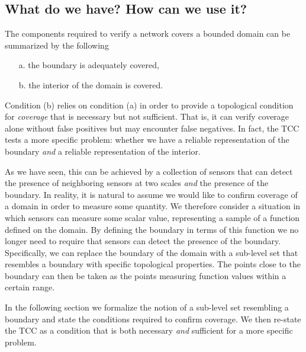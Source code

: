 \subsection{What do we have? How can we use it?}

The components required to verify a network covers a bounded domain can be summarized by the following
\begin{enumerate}
    \item[a.] the boundary is adequately covered,
    \item[b.] the interior of the domain is covered.
\end{enumerate}
Condition (b) relies on condition (a) in order to provide a topological condition for \emph{coverage} that is necessary but not sufficient.
That is, it can verify coverage alone without false positives but may encounter false negatives.
In fact, the TCC tests a more specific problem: whether we have a reliable representation of the boundary \emph{and} a reliable representation of the interior.

As we have seen, this can be achieved by a collection of sensors that can detect the presence of neighboring sensors at two scales \emph{and} the presence of the boundary.
In reality, it is natural to assume we would like to confirm coverage of a domain in order to measure some quantity.
We therefore consider a situation in which sensors can measure some scalar value, representing a sample of a function defined on the domain.
By defining the boundary in terms of this function we no longer need to require that sensors can detect the presence of the boundary.
Specifically, we can replace the boundary of the domain with a sub-level set that resembles a boundary with specific topological properties.
The points close to the boundary can then be taken as the points measuring function values within a certain range.

In the following section we formalize the notion of a sub-level set resembling a boundary and state the conditions required to confirm coverage.
We then re-state the TCC as a condition that is both necessary \emph{and} sufficient for a more specific problem.%

